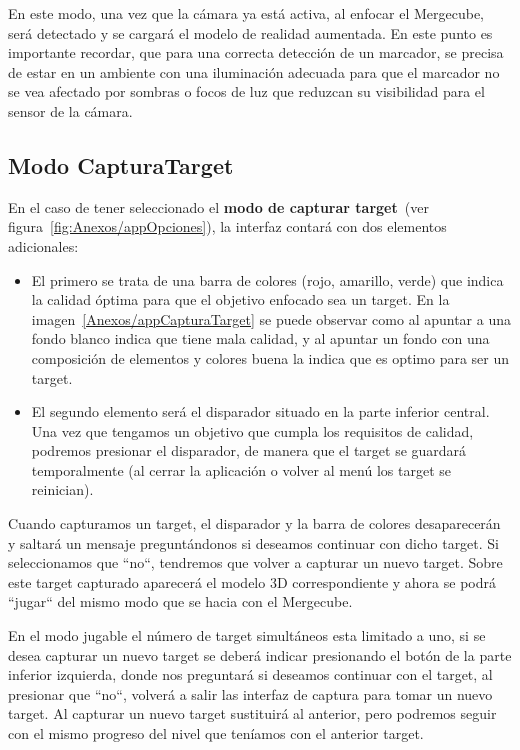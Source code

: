 En este modo, una vez que la cámara ya está activa, al enfocar el Mergecube, será detectado y se cargará el modelo de realidad aumentada. En este punto es importante recordar, que para una correcta detección de un marcador, se precisa de estar en un ambiente con una iluminación adecuada para que el marcador no se vea afectado por sombras o focos de luz que reduzcan su visibilidad para el sensor de la cámara.


\subsection{Modo CapturaTarget}

En el caso de tener seleccionado el \textbf{modo de capturar target}~(ver figura~\ref{fig:Anexos/appOpciones}), la interfaz contará con dos elementos adicionales: 
\begin{itemize}
	\item El primero se trata de una barra de colores (rojo, amarillo, verde) que indica la calidad óptima para que el objetivo enfocado sea un target. En la imagen~\ref{Anexos/appCapturaTarget} se puede observar como al apuntar a una fondo blanco indica que tiene mala calidad, y al apuntar un fondo con una composición de elementos y colores buena la indica que es optimo para ser un target.
	\item El segundo elemento será el disparador situado en la parte inferior central. Una vez que tengamos un objetivo que cumpla los requisitos de calidad, podremos presionar el disparador, de manera que el target se guardará temporalmente (al cerrar la aplicación o volver al menú los target se reinician). 
\end{itemize}

Cuando capturamos un target, el disparador y la barra de colores desaparecerán y saltará un mensaje preguntándonos si deseamos continuar con dicho target. Si seleccionamos que ``no``, tendremos que volver a capturar un nuevo target. Sobre este target capturado aparecerá el modelo 3D correspondiente y ahora se podrá ``jugar`` del mismo modo que se hacia con el Mergecube. 

En el modo jugable el número de target simultáneos esta limitado a uno, si se desea capturar un nuevo target se deberá indicar presionando el botón de la parte inferior izquierda, donde nos preguntará si deseamos continuar con el target, al presionar que ``no``, volverá a salir las interfaz de captura para tomar un nuevo target. Al capturar un nuevo target sustituirá al anterior, pero podremos seguir con el mismo progreso del nivel que teníamos con el anterior target. 

